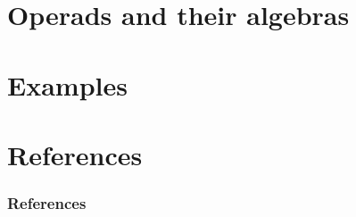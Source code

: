 \documentclass[10pt,t]{beamer}
\begin{document}
\section{Operads and their algebras}

\section{Examples}

\section*{References}

\begin{frame}%
	\frametitle{References}
	\nocite{whitney1935history}
	
	
\end{frame}
\end{document}
